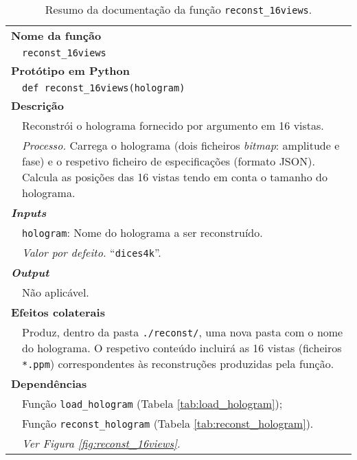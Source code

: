 \begin{table}[!htbp]
    \centering
    \caption{Resumo da documentação da função \texttt{reconst\_16views}.}
    \label{tab:reconst_16views}
    \begin{tabular}{p{1cm} p{10cm}}
        \hline
        \multicolumn{2}{l}{\bfseries Nome da função}\\
         & \verb|reconst_16views|\\
        \hline
        \multicolumn{2}{l}{\bfseries Protótipo em Python}\\
         & \texttt{def reconst_16views(hologram)} \\
        \hline\multicolumn{2}{l}{\bfseries Descrição}\\
         & Reconstrói o holograma fornecido por argumento em 16 vistas. \\
         & \textit{Processo.} Carrega o holograma (dois ficheiros \textit{bitmap}: amplitude e fase) e o respetivo ficheiro de especificações (formato JSON). Calcula as posições das 16 vistas tendo em conta o tamanho do holograma.\\
        \hline\multicolumn{2}{l}{\bfseries \textit{Inputs}}\\
         & \verb|hologram|: Nome do holograma a ser reconstruído.\\
         & \hspace{1cm} \textit{Valor por defeito.} ``\verb|dices4k|''.\\
        \hline\multicolumn{2}{l}{\bfseries \textit{Output}}\\
         & Não aplicável.\\
        \hline\multicolumn{2}{l}{\bfseries Efeitos colaterais}\\
         & Produz, dentro da pasta \verb|./reconst/|, uma nova pasta com o nome do holograma. O respetivo conteúdo incluirá as 16 vistas (ficheiros \verb|*.ppm|) correspondentes às reconstruções produzidas pela função.\\
        \hline\multicolumn{2}{l}{\bfseries Dependências}\\
         & Função \verb|load_hologram| (Tabela \ref{tab:load_hologram}); \\
         & Função \verb|reconst_hologram| (Tabela \ref{tab:reconst_hologram}). \\
         & \textit{Ver Figura \ref{fig:reconst_16views}.} \\
        \hline
    \end{tabular}
\end{table}

